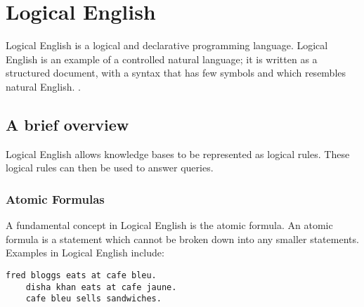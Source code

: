 \documentclass[../main.tex]{subfiles}
\begin{document}
\chapter{Logical English}
\label{chapter:le}
Logical English is a logical and declarative programming language. Logical English is an example of a controlled natural language; it is written as a structured document, with a syntax that has few symbols and which resembles natural English. \cite{logical_english}.

\section{A brief overview}
Logical English allows knowledge bases to be represented as logical rules. These logical rules can then be used to answer queries. 

\subsection{Atomic Formulas}
A fundamental concept in Logical English is the atomic formula. An atomic formula is a statement which cannot be broken down into any smaller statements. Examples in Logical English include:
\begin{lstlisting}[language={LE},caption={An example of three atomic formulas in Logical English.},label={le:atomic formulas}]
    fred bloggs eats at cafe bleu.
    disha khan eats at cafe jaune.
    cafe bleu sells sandwiches.
\end{lstlisting}
\end{document}
